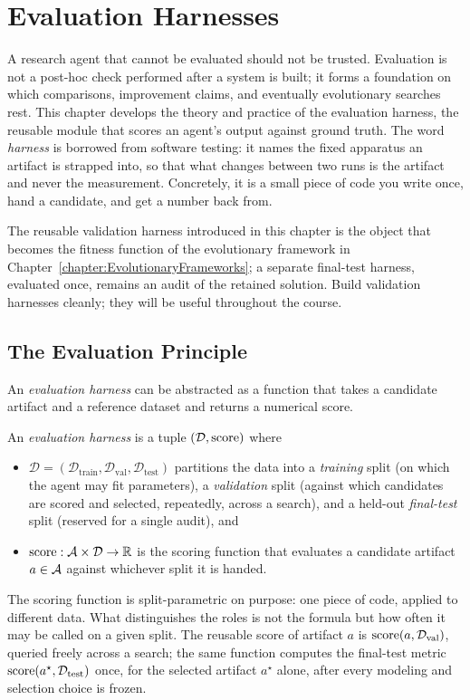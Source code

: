 \chapter{Evaluation Harnesses}
\label{chapter:Evaluation}

A research agent that cannot be evaluated should not be trusted.
Evaluation is not a post-hoc check performed after a system is built; it forms a foundation on which comparisons, improvement claims, and eventually evolutionary searches rest.
This chapter develops the theory and practice of the evaluation harness, the reusable module that scores an agent's output against ground truth.
The word \emph{harness} is borrowed from software testing: it names the fixed apparatus an artifact is strapped into, so that what changes between two runs is the artifact and never the measurement.
Concretely, it is a small piece of code you write once, hand a candidate, and get a number back from.

The reusable validation harness introduced in this chapter is the object that becomes the fitness function of the evolutionary framework in Chapter~\ref{chapter:EvolutionaryFrameworks}; a separate final-test harness, evaluated once, remains an audit of the retained solution.
Build validation harnesses cleanly; they will be useful throughout the course.

\section{The Evaluation Principle}
\label{section:EvaluationPrinciple}

An \emph{evaluation harness} can be abstracted as a function that takes a candidate artifact and a reference dataset and returns a numerical score.
\begin{definition}
\label{definition:EvalHarness}
An \emph{evaluation harness} is a tuple $(\mathcal{D}, \mathrm{score})$ where
\begin{itemize}
\item $\mathcal{D} = (\mathcal{D}_{\mathrm{train}}, \mathcal{D}_{\mathrm{val}}, \mathcal{D}_{\mathrm{test}})$ partitions the data into a \emph{training} split (on which the agent may fit parameters), a \emph{validation} split (against which candidates are scored and selected, repeatedly, across a search), and a held-out \emph{final-test} split (reserved for a single audit), and
\item $\mathrm{score} : \mathcal{A} \times \mathcal{D} \to \mathbb{R}$ is the scoring function that evaluates a candidate artifact $a \in \mathcal{A}$ against whichever split it is handed.
\end{itemize}
The scoring function is split-parametric on purpose: one piece of code, applied to different data.
What distinguishes the roles is not the formula but how often it may be called on a given split.
The reusable score of artifact $a$ is $\mathrm{score}(a, \mathcal{D}_{\mathrm{val}})$, queried freely across a search; the same function computes the final-test metric $\mathrm{score}(a^{\star}, \mathcal{D}_{\mathrm{test}})$ once, for the selected artifact $a^{\star}$ alone, after every modeling and selection choice is frozen.
\end{definition}

